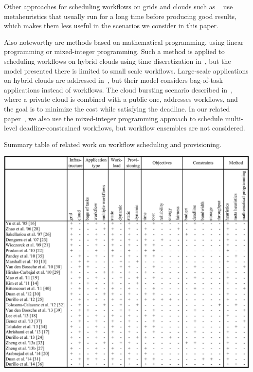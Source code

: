 \documentclass[preprint,5p]{elsarticle}
\begin{document}
Other approaches for scheduling workflows on grids and clouds such as ~\cite{Talukder2009,Pandey2010,Durillo2014} use
metaheuristics that usually run for a long time before producing good results,
which makes them less useful in the scenarios we consider in this paper. 

Also noteworthy are methods based on mathematical programming, 
using linear programming or mixed-integer programming. 
Such a method is applied to scheduling workflows on hybrid clouds using time discretization in~\cite{Genez13b}, 
but the model presented there is limited to small scale workflows. 
Large-scale applications on hybrid clouds are addressed in~\cite{VandenBossche2010,VandenBossche2013973}, 
but their model considers bag-of-task applications instead of workflows. 
The cloud bursting scenario described in~\cite{BittencourtM11}, where a private cloud is combined with a public one, 
addresses workflows, and the goal is to minimize the cost while satisfying the deadline. 
In our related paper~\cite{optimization-ppam13}, we also use the mixed-integer programming approach 
to schedule multi-level deadline-constrained workflows, but workflow ensembles are not considered.

\begin{table}[tb]
    \centering
    \caption{Summary table of related work on workflow scheduling and provisioning.} 
    \label{tab:related}
    \includegraphics[width=\textwidth]{Cloud-workflows-table}
\end{table}
\end{document}
